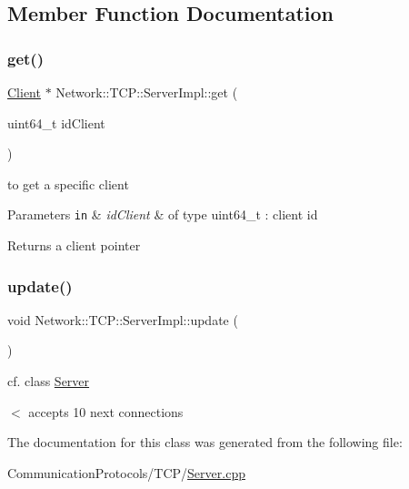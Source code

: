 \subsection{Member Function Documentation}
\mbox{\label{class_network_1_1_t_c_p_1_1_server_impl_a962a14d824fdd5aec78eacb0643b206d}} 
\subsubsection{\texorpdfstring{get()}{get()}}
{\footnotesize\ttfamily \hyperlink{class_network_1_1_t_c_p_1_1_client}{Client} $\ast$ Network\+::\+T\+C\+P\+::\+Server\+Impl\+::get (\begin{DoxyParamCaption}\item[{uint64\+\_\+t}]{id\+Client }\end{DoxyParamCaption})}



to get a specific client 


\begin{DoxyParams}[1]{Parameters}
\mbox{\tt in}  & {\em id\+Client} & of type uint64\+\_\+t \+: client id \\
\hline
\end{DoxyParams}
\begin{DoxyReturn}{Returns}
a client pointer 
\end{DoxyReturn}
\mbox{\label{class_network_1_1_t_c_p_1_1_server_impl_a7396997a25ce53506c8f8a69cec72774}} 
\subsubsection{\texorpdfstring{update()}{update()}}
{\footnotesize\ttfamily void Network\+::\+T\+C\+P\+::\+Server\+Impl\+::update (\begin{DoxyParamCaption}{ }\end{DoxyParamCaption})}



cf. class \hyperlink{class_network_1_1_t_c_p_1_1_server}{Server} 

$<$ accepts 10 next connections 

The documentation for this class was generated from the following file\+:\begin{DoxyCompactItemize}
\item 
Communication\+Protocols/\+T\+C\+P/\hyperlink{_server_8cpp}{Server.\+cpp}\end{DoxyCompactItemize}
